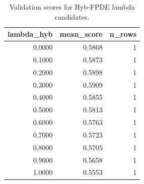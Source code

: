 \begin{table}[t]
\caption{Validation scores for Hyb-FPDE lambda candidates.}
\label{tab:lambda_distribution_computed}
\centering
\begin{tabular}{rrr}
\toprule
lambda\_hyb & mean\_score & n\_rows \\
\midrule
0.0000 & 0.5868 & 1 \\
0.1000 & 0.5873 & 1 \\
0.2000 & 0.5898 & 1 \\
0.3000 & 0.5909 & 1 \\
0.4000 & 0.5855 & 1 \\
0.5000 & 0.5813 & 1 \\
0.6000 & 0.5763 & 1 \\
0.7000 & 0.5723 & 1 \\
0.8000 & 0.5705 & 1 \\
0.9000 & 0.5658 & 1 \\
1.0000 & 0.5553 & 1 \\
\bottomrule
\end{tabular}

\end{table}

